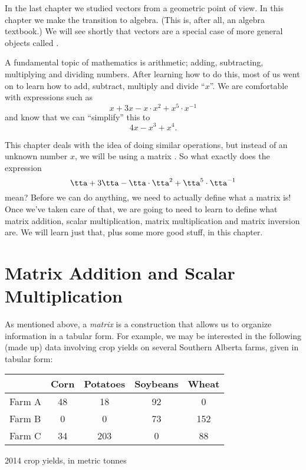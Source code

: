 In the last chapter we studied vectors from a geometric point of view. In this chapter we make the transition to algebra. (This is, after all, an algebra textbook.) We will see shortly that vectors are a special case of more general objects called .

A fundamental topic of mathematics is arithmetic; adding, subtracting, multiplying and dividing numbers. After learning how to do this, most of us went on to learn how to add, subtract, multiply and divide ``$x$''. We are comfortable with expressions such as 
\[
x+3x-x\cdot x^2+x^5\cdot x^{-1}
\]
and know that we can ``simplify'' this to 
\[
4x-x^3+x^4.
\]

This chapter deals with the idea of doing similar operations, but instead of an unknown number $x$, we will be using a matrix \tta. So what exactly does the expression 
\[
\tta+3\tta-\tta\cdot \tta^2+\tta^5\cdot \tta^{-1}
\]
mean? Before we can do anything, we need to actually define what a matrix is! Once we've taken care of that, we are going to need to learn to define what matrix addition, scalar multiplication, matrix multiplication and matrix inversion are. We will learn just that, plus some more good stuff, in this chapter.

\section{Matrix Addition and Scalar Multiplication}\label{sec:matrix_arithmetic_1}


As mentioned above, a \textit{matrix} is a construction that allows us to organize information in a tabular form. For example, we may be interested in the following (made up) data involving crop yields on several Southern Alberta farms, given in tabular form:

\noindent\begin{minipage}{\textwidth}
\begin{center}
\begin{tabular}{l|cccc|}
	 & Corn & Potatoes & Soybeans & Wheat\\
\hline 
 Farm A & 48 & 18 & 92 & 0\\
 Farm B & 0 & 0 & 73 & 152\\
 Farm C & 34 & 203 & 0 & 88\\
 \hline
\end{tabular}
\end{center}
\captionsetup{type=figure}
\caption{2014 crop yields, in metric tonnes}
\end{minipage}

